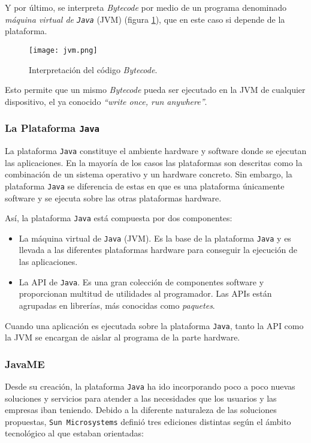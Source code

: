 Y por último, se interpreta \emph{Bytecode} por medio de un programa
denominado \emph{máquina virtual de \texttt{Java}} (\acs{JVM}) (figura
\ref{fig:jvm}), que en este caso si depende de la plataforma.

  \begin{figure}[H]
    \begin{center}
      \texttt{[image: jvm.png]}
      \caption{Interpretación del código \emph{Bytecode}.}
      \label{fig:jvm}
    \end{center}
  \end{figure}

Esto permite que un mismo \emph{Bytecode} pueda ser ejecutado en la
\acs{JVM} de cualquier dispositivo, el ya conocido \emph{``write once, run
anywhere''}.

\subsubsection{La Plataforma \texttt{Java}}
La plataforma \texttt{Java} constituye el ambiente hardware y software donde
se ejecutan las aplicaciones. En la mayoría de los casos las plataformas son
descritas como la combinación de un sistema operativo y un hardware concreto.
Sin embargo, la plataforma \texttt{Java} se diferencia de estas en que es una
plataforma únicamente software y se ejecuta sobre las otras plataformas
hardware.

Así, la plataforma \texttt{Java} está compuesta por dos componentes:
\begin{itemize}
\item La máquina virtual de \texttt{Java} (\acs{JVM}). Es la base de la 
plataforma \texttt{Java} y es llevada a las diferentes plataformas hardware
para conseguir la ejecución de las aplicaciones.
\item La \acs{API} de \texttt{Java}. Es una gran colección de componentes
software y proporcionan multitud de utilidades al programador. Las \acs{API}s
están agrupadas en librerías, más conocidas como \emph{paquetes}.
\end{itemize}

Cuando una aplicación es ejecutada sobre la plataforma \texttt{Java}, tanto la
\acs{API} como la \acs{JVM} se encargan de aislar al programa de la parte
hardware.

\subsubsection{JavaME}
Desde su creación, la plataforma \texttt{Java} ha ido incorporando poco a poco
nuevas soluciones y servicios para atender a las necesidades que los usuarios y 
las empresas iban teniendo. Debido a la diferente naturaleza de las soluciones
propuestas, \texttt{Sun Microsystems} definió tres ediciones distintas
según el ámbito tecnológico al que estaban orientadas:


